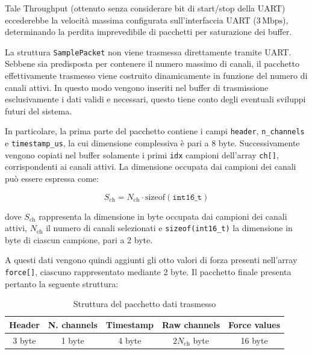 \documentclass[10pt, a4paper]{article}
\begin{document}
                Tale Throughput (ottenuto senza considerare bit di start/stop della UART) eccederebbe la velocità massima configurata sull'interfaccia 
                UART ($3\,\mathrm{Mbps}$), determinando la perdita imprevedibile 
                di pacchetti per saturazione dei buffer.

                La struttura \texttt{SamplePacket} non viene trasmessa direttamente tramite UART. Sebbene sia predisposta per contenere il numero 
                massimo di canali, il pacchetto effettivamente trasmesso viene costruito dinamicamente in funzione del numero di canali attivi. In questo modo 
                vengono inseriti nel buffer di trasmissione esclusivamente i dati validi e necessari, questo tiene conto degli eventuali sviluppi futuri del sistema.

                In particolare, la prima parte del pacchetto contiene i campi \texttt{header}, \texttt{n\_channels} e \texttt{timestamp\_us}, la cui dimensione
                 complessiva è pari a 8 byte. Successivamente vengono copiati nel buffer solamente i primi \texttt{idx} campioni dell'array \texttt{ch[]}, 
                 corrispondenti ai canali attivi. La dimensione occupata dai campioni dei canali può essere espressa come:

                    \begin{equation}
                        S_{\mathrm{ch}} =
                        N_{\mathrm{ch}} \cdot \mathrm{sizeof}(\texttt{int16\_t})
                    \end{equation}

                dove $S_{\mathrm{ch}}$ rappresenta la dimensione in byte occupata dai campioni dei canali attivi, $N_{\mathrm{ch}}$ il numero di canali 
                selezionati e \texttt{sizeof(int16\_t)} la dimensione in byte di ciascun campione, pari a 2 byte.

                A questi dati vengono quindi aggiunti gli otto valori di forza presenti nell'array \texttt{force[]}, ciascuno rappresentato mediante 2 byte. 
                Il pacchetto finale presenta pertanto la seguente struttura:

                    \begin{table}[H]
                        \centering
                        \caption{Struttura del pacchetto dati trasmesso}
                        \label{tab:pacchetto}
                        \begin{tabular}{|c|c|c|c|c|}
                            \hline
                            \textbf{Header} & \textbf{N. channels} & \textbf{Timestamp} & \textbf{Raw channels} & \textbf{Force values} \\ \hline
                            3 byte & 1 byte & 4 byte & $2N_{\mathrm{ch}}$ byte & 16 byte \\ \hline
                        \end{tabular}
                    \end{table}
\end{document}
